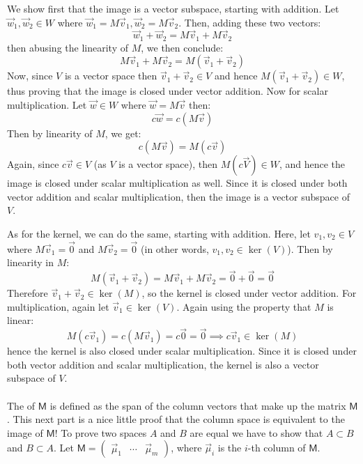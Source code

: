 \documentclass{article}
\begin{document}
\begin{solution}
	We show first that the image is a vector subspace, starting with addition. Let
	$\vec w_1, \vec w_2 \in W$ where $\vec w_1 = M \vec v_1, \vec w_2 = M\vec v_2$. Then, adding these 
	two vectors: 
	\[
	\vec w_1 + \vec w_2 = M\vec v_1 + M \vec v_2
	\] 
	then abusing the linearity of $M$, we then conclude:
	\[
	M \vec v_1 + M \vec v_2 = M(\vec v_1 + \vec v_2) 
	\] 
	Now, since $V$ is a vector space then $\vec v_1 + \vec v_2 \in V$ and hence $M(\vec v_1 + \vec v_2) \in W$, 
	thus proving that the image is closed under vector addition. Now for scalar multiplication. Let $\vec w 
	\in W$ where $\vec w = M\vec v$ then:
	\[
	c\vec w = c(M\vec v) 
	\] 
	Then by linearity of $M$, we get: 
	\[
	c(M \vec v) = M(c \vec v)
	\] 
	Again, since $c\vec v \in V$ (as $V$ is a vector space), then $M(c \vec V) \in W$, and hence the image is closed under scalar 
	multiplication as well. Since it is closed under both vector addition and scalar multiplication, then 
	the image is a vector subspace of $V$.

	As for the kernel, we can do the same, starting with addition. Here, let $v_1, v_2 \in V$ where $M\vec v_1
	= \vec 0$ and $M \vec v_2 = \vec 0$ (in other words, $v_1, v_2 \in \ker(V)$). Then by linearity in $M$:
	\[
	M(\vec v_1 + \vec v_2) = M\vec v_1 + M\vec v_2 = \vec 0 + \vec 0 = \vec 0
	\] 
	Therefore $\vec v_1+ \vec v_2 \in \ker(M)$, so the kernel is closed under vector addition. For multiplication, again let $\vec v_1 \in \ker(V)$. Again
	using the property that $M$ is linear:
	\[
	M(c \vec v_1) = c(M\vec v_1) = c \vec 0 = \vec 0 \implies c\vec v_1 \in \ker(M)
	\] 
	hence the kernel is also closed under scalar multiplication. Since it is closed under both vector addition 
	and scalar multiplication, the kernel is also a vector subspace of $V$.  
\end{solution}

\paragraph{}
The  of $\mathsf{M}$ is defined as the span of the column vectors that make up the matrix $\mathsf{M}$.  This next part is a nice little proof that the column 
space is equivalent to the image of $\mathsf{M}$!  To prove two spaces $A$ and $B$ are equal we have to show that 
$A\subset B$ and $B \subset A$.  Let $\mathsf{M} = \begin{pmatrix} \vec{\mu}_{1} & \cdots & \vec{\mu}_{m}\end{pmatrix}$, where $\vec{\mu}_{i}$ is the $i$-th column of $\mathsf{M}$.
\end{document}
